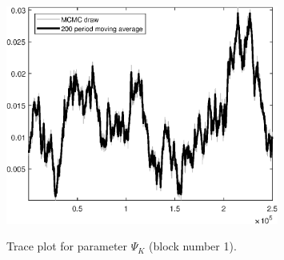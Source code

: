 \begin{figure}[H]
\centering
  \includegraphics[width=0.8\textwidth]{BRS_imp_mobility/graphs/TracePlot_Psi_K_blck_1}\\
    \caption{Trace plot for parameter ${\Psi_K}$ (block number 1).}
\end{figure}
